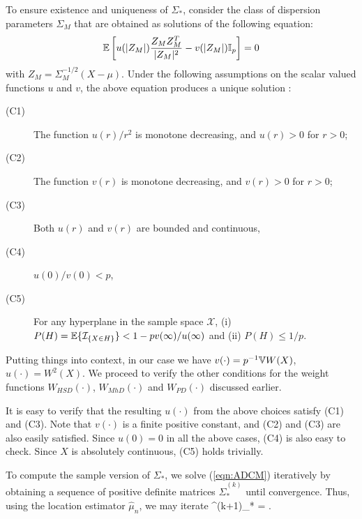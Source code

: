 To ensure existence and uniqueness of $\Sigma_{*}$, consider the class of 
dispersion parameters $\Sigma_M$ that are obtained as solutions of the following equation:
%
\begin{equation}
\BE \left[ u( | Z_{M} | )  \frac{Z_{M} Z_{M}^T}{| Z_{M} |^2}  - v( | Z_{M} | ) \BI_p \right] = 0
\end{equation}
%
with $Z_M = \Sigma_M^{-1/2} (X - \mu)$. Under the following assumptions on the scalar valued functions $u$ and $v$, the above equation produces a unique solution \citep{ref:HuberBook81}:
%

\begin{description}
\item[(C1)] The function $u(r)/r^2$ is monotone decreasing, 
and $u(r)>0$ for $r > 0$;

\item[(C2)]  The function $v(r)$ is monotone decreasing, and 
$v(r) > 0$ for $r > 0$;

\item[(C3)] Both $u(r)$ and $v(r)$ are bounded and continuous,

\item[(C4)] $u(0) / v(0) < p$,

\item[(C5)] For any hyperplane in the sample space $\mathcal X$, 
(i) $P(H) = {\mathbb{E}} \{ \mathcal{I}_{\{X \in H \}} \} < 1 - p v(\infty) / u(\infty)$ and 
(ii) $P(H) \leq 1/p$.
\end{description}

Putting things into context, in our case we have 
$v (\cdot) = p^{-1}{\mathbb{V}} W (X)$, 
$u (\cdot) = W^{2}(X)$. 
We proceed to verify the other conditions for the weight functions 
$W_{HSD} (\cdot)$, 
$W_{MhD} (\cdot)$ and $W_{PD} (\cdot)$ discussed earlier.

It is easy to verify that the resulting $u (\cdot)$ from the above choices 
satisfy (C1) and (C3). 
Note that $v (\cdot)$ is a finite positive constant, 
and (C2) and (C3) are also easily satisfied. 
Since $u (0) = 0$ in all the above cases, (C4) is also easy to check. Since $X$ is 
absolutely continuous, (C5) holds trivially.

To compute the sample version of $\Sigma_{*}$, we solve (\ref{eqn:ADCM}) 
iteratively by obtaining a sequence of positive definite matrices 
$\hat{\Sigma}^{(k)}_{*}$ until convergence. Thus, using the location 
estimator $\hat{\mu}_{n}$, we may iterate
%
\ban
\hat{\Sigma}^{(k+1)}_{*}  = 
\BE {}.
\ean
%


